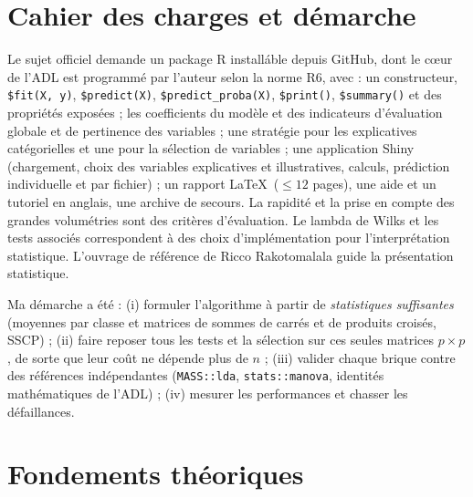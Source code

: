 \documentclass[10.5pt,a4paper]{article}
\newcommand{\code}[1]{\texttt{#1}}
\begin{document}
\section{Cahier des charges et d\'emarche}
Le sujet officiel \cite{sujet} demande un package R install\'able depuis GitHub, dont le c\oe ur de l'ADL est programm\'e par l'auteur selon la norme R6, avec : un constructeur, \code{\$fit(X, y)}, \code{\$predict(X)}, \code{\$predict\_proba(X)}, \code{\$print()}, \code{\$summary()} et des propri\'et\'es expos\'ees ; les coefficients du mod\`ele et des indicateurs d'\'evaluation globale et de pertinence des variables ; une strat\'egie pour les explicatives cat\'egorielles et une pour la s\'election de variables ; une application Shiny (chargement, choix des variables explicatives et illustratives, calculs, pr\'ediction individuelle et par fichier) ; un rapport \LaTeX\ ($\leq 12$ pages), une aide et un tutoriel en anglais, une archive de secours. La rapidit\'e et la prise en compte des grandes volum\'etries sont des crit\`eres d'\'evaluation. Le lambda de Wilks et les tests associ\'es correspondent \`a des choix d'impl\'ementation pour l'interpr\'etation statistique. L'ouvrage de r\'ef\'erence de Ricco Rakotomalala \cite{rako} guide la pr\'esentation statistique.

Ma d\'emarche a \'et\'e : (i) formuler l'algorithme \`a partir de \emph{statistiques suffisantes} (moyennes par classe et matrices de sommes de carr\'es et de produits crois\'es, SSCP) ; (ii) faire reposer tous les tests et la s\'election sur ces seules matrices $p\times p$, de sorte que leur co\^ut ne d\'epende plus de $n$ ; (iii) valider chaque brique contre des r\'ef\'erences ind\'ependantes (\code{MASS::lda}, \code{stats::manova}, identit\'es math\'ematiques de l'ADL) ; (iv) mesurer les performances et chasser les d\'efaillances.

\section{Fondements th\'eoriques}\label{sec:theorie}
\end{document}
